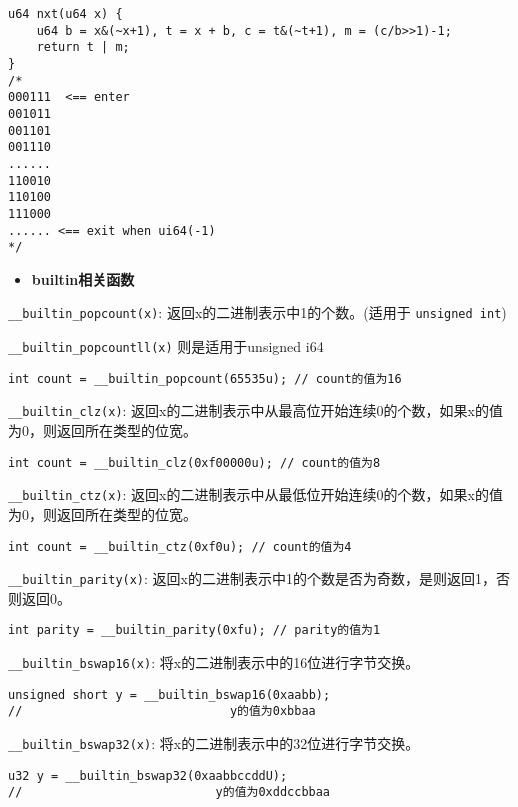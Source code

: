 \documentclass[a4paper,landscape,twocolumn]{ctexart}
\newcommand{\point}[1]{
	\begin{itemize}
		\item \textbf{#1}
	\end{itemize}
}
\begin{document}
\begin{lstlisting}
u64 nxt(u64 x) {
	u64 b = x&(~x+1), t = x + b, c = t&(~t+1), m = (c/b>>1)-1;
	return t | m;
}
/*
000111  <== enter
001011
001101
001110
......
110010
110100
111000
...... <== exit when ui64(-1)
*/
\end{lstlisting}

\point{builtin相关函数}

\texttt{\_\_builtin\_popcount(x)}: 返回x的二进制表示中1的个数。(适用于 \texttt{unsigned int})

\texttt{\_\_builtin\_popcountll(x)} 则是适用于unsigned i64

\begin{lstlisting}
int count = __builtin_popcount(65535u); // count的值为16
\end{lstlisting}

\texttt{\_\_builtin\_clz(x)}: 返回x的二进制表示中从最高位开始连续0的个数，如果x的值为0，则返回所在类型的位宽。

\begin{lstlisting}
int count = __builtin_clz(0xf00000u); // count的值为8
\end{lstlisting}

\texttt{\_\_builtin\_ctz(x)}: 返回x的二进制表示中从最低位开始连续0的个数，如果x的值为0，则返回所在类型的位宽。

\begin{lstlisting}
int count = __builtin_ctz(0xf0u); // count的值为4
\end{lstlisting}

\texttt{\_\_builtin\_parity(x)}: 返回x的二进制表示中1的个数是否为奇数，是则返回1，否则返回0。

\begin{lstlisting}
int parity = __builtin_parity(0xfu); // parity的值为1
\end{lstlisting}

\texttt{\_\_builtin\_bswap16(x)}: 将x的二进制表示中的16位进行字节交换。
\begin{lstlisting}
unsigned short y = __builtin_bswap16(0xaabb);
//                             y的值为0xbbaa
\end{lstlisting}

\texttt{\_\_builtin\_bswap32(x)}: 将x的二进制表示中的32位进行字节交换。

\begin{lstlisting}
u32 y = __builtin_bswap32(0xaabbccddU);
//                           y的值为0xddccbbaa
\end{lstlisting}
\end{document}
